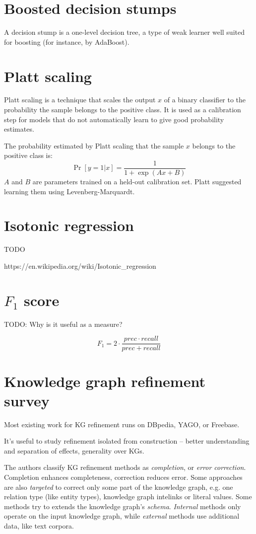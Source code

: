 \section{Boosted decision stumps}
\label{boosted-decision-stumps}
A decision stump is a one-level decision tree, a type of weak learner
well suited for boosting (for instance, by AdaBoost).

\section{Platt scaling}
\label{platt-scaling}

Platt scaling\cite{platt-scaling} is a technique that scales the output $x$ of a binary classifier
to the probability the sample belongs to the positive class. It is used as a
calibration step for models that do not automatically learn to give good
probability estimates.

The probability estimated by Platt scaling that the sample $x$ belongs to the
positive class is:
$$\Pr[y=1|x] = \frac{1}{1+\exp(Ax+B)}$$
$A$ and $B$ are parameters trained on a held-out calibration set.
Platt suggested learning them using Levenberg-Marquardt.

\section{Isotonic regression}
\label{isotonic-regression}
TODO

https://en.wikipedia.org/wiki/Isotonic\_regression

\section{$F_1$ score}
\label{f-1}
TODO: Why is it useful as a measure?

$$F_1 = 2\cdot\frac{prec \cdot recall}{prec + recall}$$

\section{Knowledge graph refinement survey\cite{kg-refinement-survey}}

Most existing work for KG refinement runs on DBpedia, YAGO, or Freebase.

It's useful to study refinement isolated from construction -- better
understanding and separation of effects, generality over KGs.

The authors classify KG refinement methods as \textit{completion}, or
\textit{error correction}. Completion enhances completeness, correction
reduces error.
Some approaches are also \textit{targeted} to correct only some part of the
knowledge graph, e.g. one relation type (like entity types), knowledge graph
intelinks or literal values.
Some methods try to extends the knowledge graph's \textit{schema}.
\textit{Internal} methods only operate on the input knowledge graph, while
\textit{external} methods use additional data, like text corpora.


